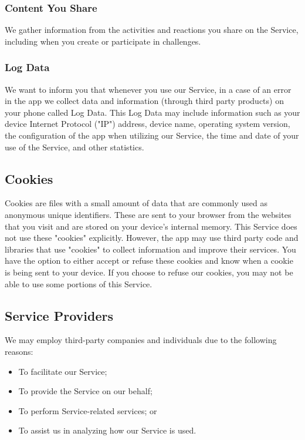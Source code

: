 \subsubsection*{Content You Share}
We gather information from the activities and reactions you share on the Service, including when you create or participate in challenges.

\subsubsection*{Log Data}
We want to inform you that whenever you use our Service, in a case of an error in the app we collect data and information (through third party products) on your phone called Log Data. This Log Data may include information such as your device Internet Protocol ("IP") address, device name, operating system version, the configuration of the app when utilizing our Service, the time and date of your use of the Service, and other statistics.

\subsection*{Cookies}
Cookies are files with a small amount of data that are commonly used as anonymous unique identifiers. These are sent to your browser from the websites that you visit and are stored on your device's internal memory. This Service does not use these "cookies" explicitly. However, the app may use third party code and libraries that use "cookies" to collect information and improve their services. You have the option to either accept or refuse these cookies and know when a cookie is being sent to your device. If you choose to refuse our cookies, you may not be able to use some portions of this Service.

\subsection*{Service Providers}
We may employ third-party companies and individuals due to the following reasons:
\begin{itemize}
    \item To facilitate our Service;
    \item To provide the Service on our behalf;
    \item To perform Service-related services; or
    \item To assist us in analyzing how our Service is used.
\end{itemize}

